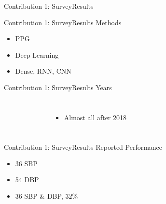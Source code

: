 \begin{frame}{Contribution 1: Survey}{Results}
    \centering
    
\end{frame}

\begin{frame}{Contribution 1: Survey}{Results}
    Methods
    \begin{figure}
        
        \hfill
        
        \hfill
        
    \end{figure}
    \begin{itemize}
        \item PPG
        \item Deep Learning
        \item Dense, RNN, CNN
    \end{itemize}
\end{frame}

\begin{frame}{Contribution 1: Survey}{Results}
    Years
    \begin{columns}
        \begin{figure}
            
        \end{figure}

        \begin{itemize}
            \item Almost all after 2018
        \end{itemize}
    \end{columns}


\end{frame}

\begin{frame}{Contribution 1: Survey}{Results}
    Reported Performance

    \begin{figure}
        
        
    \end{figure}

    \begin{itemize}
        \item 36 SBP
        \item 54 DBP
        \item 36 SBP \& DBP, $32\%$
    \end{itemize}
\end{frame}

